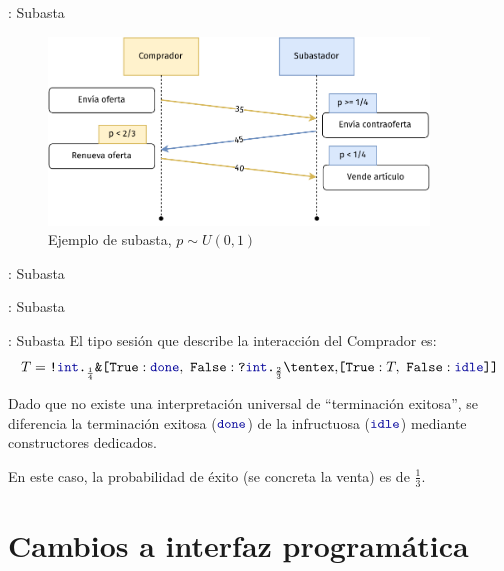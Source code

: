 \begin{frame}{\insertsection: Subasta}
	\begin{figure}
		\centering
		\includegraphics[width=0.9\textwidth]{images/auction-diagram.pdf}
		\caption{Ejemplo de subasta, $p \sim U(0, 1)$}
	\end{figure}
\end{frame}

\begin{frame}{\insertsection: Subasta}
	\AuctionBuyer[basicstyle=\footnotesize]
\end{frame}

\begin{frame}{\insertsection: Subasta}
	\Auctioneer[basicstyle=\footnotesize]
\end{frame}

\begin{frame}{\insertsection: Subasta}
	El tipo sesión que describe la interacción del Comprador es:
	\begin{equation*}
	    \label{eq:refined.auction}
	    \SessionType = \Out\tint{
		\BinaryPBranch[\frac{1}{4}]\Done{
		    \In\tint{
			\BinaryPChoice[\frac{2}{3}]\T\Idle
		    }
		}
	    }
	\end{equation*}

	Dado que no existe una interpretación universal de ``terminación
	exitosa'', se diferencia la terminación exitosa ($\Done$) de la
	infructuosa ($\Idle$) mediante constructores dedicados.

	\pause
	En este caso, la probabilidad de éxito (se concreta la venta) es de $\frac{1}{3}$.
\end{frame}

\section{Cambios a interfaz programática}

